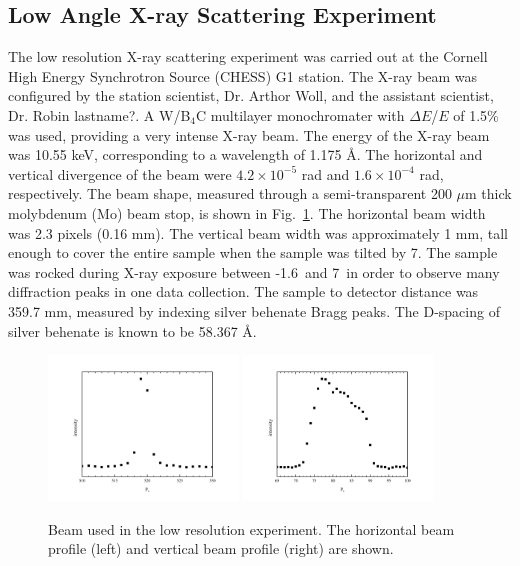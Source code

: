\subsection{Low Angle X-ray Scattering Experiment}
The low resolution X-ray scattering experiment was carried out at the Cornell 
High Energy Synchrotron Source (CHESS) G1 station. The X-ray beam was 
configured by the station scientist, Dr. Arthor Woll, and the assistant 
scientist, Dr. Robin lastname?.
A W/B$_4$C multilayer monochromater with $\Delta E$/$E$ of 1.5\% was used,
providing a very intense X-ray beam. 
The energy of the X-ray beam was 10.55 keV, corresponding to a wavelength 
of 1.175 \AA. 
The horizontal and vertical divergence of the beam were
$4.2 \times 10^{-5}$ rad and $1.6 \times 10^{-4}$ rad, respectively.
The beam shape, measured through a semi-transparent 200 $\mu$m thick
molybdenum (Mo) beam stop, is shown in Fig.~\ref{fig:ripple_lr_beam}.
The horizontal beam width was 2.3 pixels (0.16 mm). The vertical beam
width was approximately 1 mm, tall enough to cover the entire sample
when the sample was tilted by 7\textdegree. The sample was rocked
during X-ray exposure between -1.6\textdegree\ and 7\textdegree\ 
in order to observe many diffraction peaks in one data collection. 
The sample to detector distance was 359.7 mm, measured by indexing
silver behenate Bragg peaks. The D-spacing of silver behenate is known to be
58.367 \AA.

\begin{figure}
  \centering
  \includegraphics[width=0.45\textwidth]{figures/ripple/beamx_lr}
  \includegraphics[width=0.45\textwidth]{figures/ripple/beamz_lr}
  \caption{Beam used in the low resolution experiment.
  The horizontal beam profile (left) and vertical beam profile (right)
  are shown.}
  \label{fig:ripple_lr_beam}
\end{figure}

